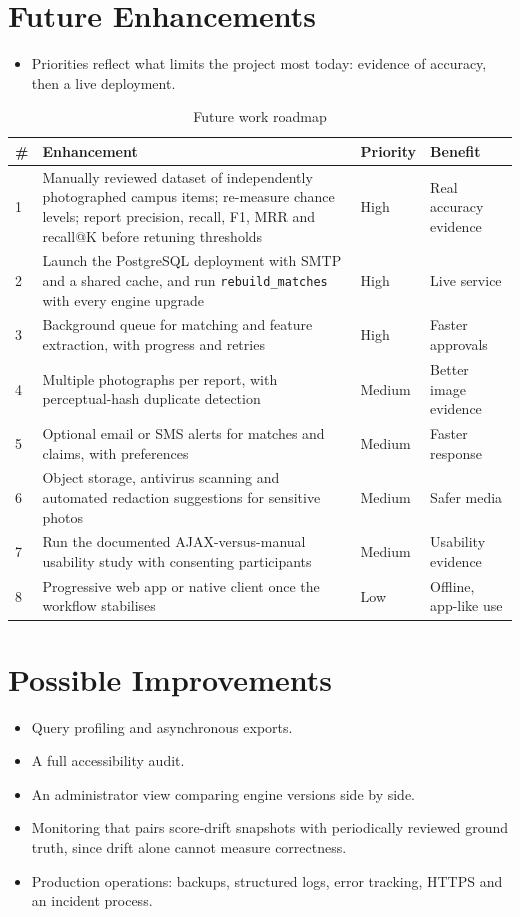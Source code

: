 \documentclass[12pt,a4paper,oneside]{report}
\newcommand{\code}[1]{\texttt{#1}}
\begin{document}
\section{Future Enhancements}
\begin{itemize}
  \item Priorities reflect what limits the project most today: evidence of accuracy, then a live deployment.
\end{itemize}
\begin{table}[!tbp]
\centering\small
\caption{Future work roadmap}
\begin{tabularx}{\textwidth}{P{6mm}X P{18mm}P{30mm}}
\toprule
\# & Enhancement & Priority & Benefit\\
 & Manually reviewed dataset of independently photographed campus items; re-measure chance levels; report precision, recall, F1, MRR and recall@K before retuning thresholds & High & Real accuracy evidence\\
2 & Launch the PostgreSQL deployment with SMTP and a shared cache, and run \code{rebuild\_matches} with every engine upgrade & High & Live service\\
3 & Background queue for matching and feature extraction, with progress and retries & High & Faster approvals\\
4 & Multiple photographs per report, with perceptual-hash duplicate detection & Medium & Better image evidence\\
5 & Optional email or SMS alerts for matches and claims, with preferences & Medium & Faster response\\
6 & Object storage, antivirus scanning and automated redaction suggestions for sensitive photos & Medium & Safer media\\
7 & Run the documented AJAX-versus-manual usability study with consenting participants & Medium & Usability evidence\\
8 & Progressive web app or native client once the workflow stabilises & Low & Offline, app-like use\\
\bottomrule
\end{tabularx}
\end{table}

\section{Possible Improvements}
\begin{itemize}
  \item Query profiling and asynchronous exports.
  \item A full accessibility audit.
  \item An administrator view comparing engine versions side by side.
  \item Monitoring that pairs score-drift snapshots with periodically reviewed ground truth, since drift alone cannot measure correctness.
  \item Production operations: backups, structured logs, error tracking, HTTPS and an incident process.
\end{itemize}
\end{document}
